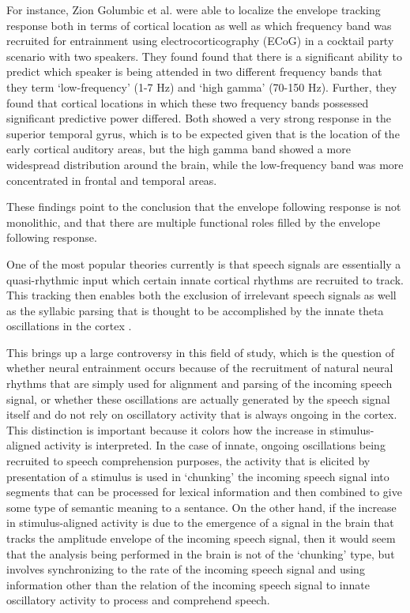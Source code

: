 \documentclass[titlepage]{article}
\begin{document}
    For instance, Zion Golumbic et al. \cite{ZionGolumbic2013} were able to
    localize the envelope tracking response both in terms of cortical location as well as which frequency
    band was recruited for entrainment using electrocorticography (ECoG) in a cocktail party scenario with
    two speakers. They found found that there is a significant ability to predict which speaker is being
    attended in two different frequency bands that they term `low-frequency' (1-7 Hz) and `high gamma' (70-150 Hz).
    Further, they found that cortical locations in which these two frequency bands possessed significant
    predictive power differed. Both showed a very strong response in the superior temporal gyrus,
    which is to be expected given that is the location of the early cortical auditory areas,
    but the high gamma band showed a more widespread distribution around the brain, while the low-frequency band
    was more concentrated in frontal and temporal areas.

    These findings point to the conclusion that the envelope following response is not monolithic, and
    that there are multiple functional roles filled by the envelope following response.

    One of the most popular theories currently is that speech signals
    are essentially a quasi-rhythmic input which certain innate cortical rhythms are recruited to track.
    This tracking then enables both the exclusion of irrelevant speech signals
    \cite{Horton2014,OSullivan2015} as well as the syllabic parsing that is thought to be accomplished
    by the innate theta oscillations in the cortex \cite{Doelling2014,Ghitza2013b}.

    This brings up a large controversy in this field of study, which is the question of whether
    neural entrainment occurs because of the recruitment of natural neural rhythms that are simply
    used for alignment and parsing of the incoming speech signal, or whether these oscillations are
    actually generated by the speech signal itself and do not rely on oscillatory activity that is
    always ongoing in the cortex. This distinction is important because it colors how the increase
    in stimulus-aligned activity is interpreted. In the case of innate, ongoing oscillations being
    recruited to speech comprehension purposes, the activity that is elicited by presentation of a
    stimulus is used in `chunking' the incoming speech signal into segments that can be processed
    for lexical information and then combined to give some type of semantic meaning to a sentance.
    On the other hand, if the increase in stimulus-aligned activity is due to the emergence of a
    signal in the brain that tracks the amplitude envelope of the incoming speech signal, then
    it would seem that the analysis being performed in the brain is not of the `chunking' type,
    but involves synchronizing to the rate of the incoming speech signal and using information
    other than the relation of the incoming speech signal to innate oscillatory activity to
    process and comprehend speech.
\end{document}
